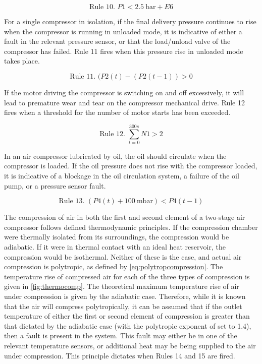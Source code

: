\begin{equation}
\text{Rule 10. } P1 < \SI{2.5}{\bar} + E6
\label{eq:rule10}
\end{equation}

For a single compressor in isolation, if the final delivery pressure continues to rise when the compressor is running in unloaded mode, it is indicative of either a fault in the relevant pressure sensor, or that the load/unload valve of the compressor has failed. Rule 11 fires when this pressure rise in unloaded mode takes place.

\begin{equation}
\text{Rule 11. } (P2(t) - (P2(t-1)) > 0
\label{eq:rule11}
\end{equation}

If the motor driving the compressor is switching on and off excessively, it will lead to premature wear and tear on the compressor mechanical drive. Rule 12 fires when a threshold for the number of motor starts has been exceeded.

\begin{equation}
\text{Rule 12. } \sum_{t = 0}^{300s}N1 > 2
\label{eq:rule12}
\end{equation}

In an air compressor lubricated by oil, the oil should circulate when the compressor is loaded. If the oil pressure does not rise with the compressor loaded, it is indicative of a blockage in the oil circulation system, a failure of the oil pump, or a pressure sensor fault.

\begin{equation}
\text{Rule 13. }(P4(t) + \SI{100}{\milli \bar}) < P4(t-1)
\label{eq:rule13}
\end{equation}

The compression of air in both the first and second element of a two-stage air compressor follows defined thermodynamic principles. If the compression chamber were thermally isolated from its surroundings, the compression would be adiabatic. If it were in thermal contact with an ideal heat reservoir, the compression would be isothermal. Neither of these is the case, and actual air compression is polytropic, as defined by \autoref{eq:polytropcompression}. The temperature rise of compressed air for each of the three types of compression is given in \autoref{fig:thermocomp}. The theoretical maximum temperature rise of air under compression is given by the adiabatic case. Therefore, while it is known that the air will compress polytropically, it can be assumed that if the outlet temperature of either the first or second element of compression is greater than that dictated by the adiabatic case (with the polytropic exponent of  set to 1.4), then a fault is present in the system. This fault may either be in one of the relevant temperature sensors, or additional heat may be being supplied to the air under compression. This principle dictates when Rules 14 and 15 are fired.

